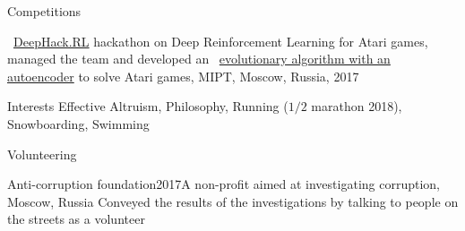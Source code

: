 \documentclass{resume} %
\begin{document}

\begin{rSection}{Competitions}
\vspace{-1em}
\item \faExternalLink~\href{http://web.archive.org/web/20170224094223/http://rl.deephack.me/}{DeepHack.RL} hackathon on Deep Reinforcement Learning for Atari games, managed the team and developed an \faExternalLink~\href{https://github.com/sergeivolodin/deephack.rl}{evolutionary algorithm with an autoencoder} to solve Atari games, MIPT, Moscow, Russia, 2017
\end{rSection}

\begin{rSection}{Interests}
	Effective Altruism, Philosophy, Running ($1/2$ marathon 2018), Snowboarding, Swimming
\end{rSection}

\begin{rSection}{Volunteering}
	\begin{rSubsection}{Anti-corruption foundation}{2017}{A non-profit aimed at investigating corruption, Moscow, Russia}{}
Conveyed the results of the investigations by talking to people on the streets as a volunteer
	\end{rSubsection}
\end{rSection}

\end{document}
